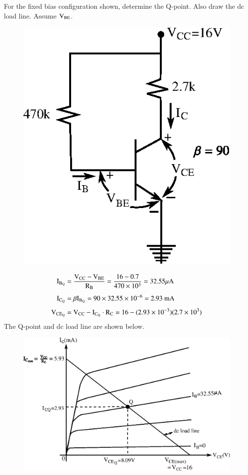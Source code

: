 \begin{problem}\label{prob3.3}
For the fixed bias configuration shown, determine the Q-point. Also draw the dc load line. Assume $\textrm{V}_{\text{BE}}$.
\begin{figure}[H]
\centering
\includegraphics{chap3/fig3.8.eps}
\end{figure}
\end{problem}

\begin{solution}
\begin{align*}
\textrm{I}_{\textrm{B}_{\textrm{Q}}} &= \frac{\textrm{V}_{\text{CC}}-\textrm{V}_{\text{BE}}}{\textrm{R}_{\textrm{B}}} = \frac{16-0.7}{470\times 10^{3}}=32.55\mu\textrm{A}\\[4pt]
\textrm{I}_{\textrm{C}_{\textrm{Q}}} &= \beta \textrm{I}_{\textrm{B}_{\textrm{Q}}} = 90\times 32.55\times 10^{-6}=2.93\text{~mA}\\[4pt]
\textrm{V}_{\text{CE}_{\textrm{Q}}} &= \textrm{V}_{\text{CC}}-\textrm{I}_{\textrm{C}_{\textrm{Q}}}\cdot \textrm{R}_{\textrm{C}} = 16 - (2.93\times 10^{-3})(2.7\times 10^{3})
\end{align*}
The Q-point and dc load line are shown below.
\begin{figure}[H]
\centering
\includegraphics{chap3/fig3.9.eps}
\end{figure}
\end{solution}

